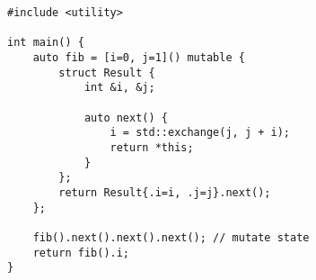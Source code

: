 \begin{lstlisting}[title=\href{https://godbolt.org/z/m9s7ei}{\texttt{godbolt.org/z/m9s7ei}}]
#include <utility>

int main() {
    auto fib = [i=0, j=1]() mutable {
        struct Result {
            int &i, &j;

            auto next() {
                i = std::exchange(j, j + i);
                return *this;
            }
        };
        return Result{.i=i, .j=j}.next();
    };

    fib().next().next().next(); // mutate state
    return fib().i;
}
\end{lstlisting}
